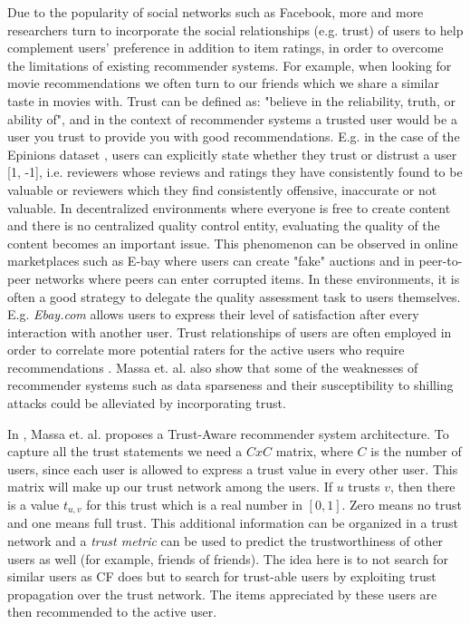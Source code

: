 Due to the popularity of social networks such as Facebook, more and more
researchers turn to incorporate the social relationships (e.g. trust) of users
to help complement users’ preference in addition to item ratings, in order to overcome the limitations of existing recommender systems. For example, when looking for movie recommendations we often turn to our friends which we share a similar taste in movies with. Trust can be defined as: "believe in the reliability, truth, or ability of", and in the context of recommender systems a trusted user would be a user you trust to provide you with good recommendations. E.g. in the case of the Epinions dataset \cite{Epinions}, users can explicitly state whether they trust or distrust a user [1, -1], i.e. reviewers whose reviews and ratings they have consistently found to be valuable or reviewers which they find consistently offensive, inaccurate or not valuable. In decentralized environments where everyone is free to create content and there
is no centralized quality control entity, evaluating the quality of the content becomes an important issue. This phenomenon can be observed in online
marketplaces such as E-bay where users can create "fake" auctions and in peer-to-peer networks where peers can enter corrupted items. In these environments, it is often a good strategy to delegate the quality assessment task to users themselves. E.g. \emph{Ebay.com} allows users to express their level of satisfaction after every interaction with another user. Trust relationships of users are often employed in order to correlate more potential raters for the active users who require recommendations \cite{Massa2004, Massa2007}. Massa et. al. \cite{Massa2004} also show that some of the weaknesses of recommender systems such as data sparseness and their susceptibility to shilling attacks could be alleviated by incorporating trust.

In \cite{Massa2004}, Massa et. al. proposes a Trust-Aware recommender system architecture.
To capture all the trust statements we need a $CxC$ matrix, where $C$ is the number of users, since each user is allowed to express a trust value in every other user. This matrix will make up our trust network among the users. If $u$
trusts $v$, then there is a value $t_{u,v}$ for this trust which is a real
number in $[0,1]$. Zero means no trust and one means full trust. This additional information can be organized in a trust network and a \emph{trust metric} can be used to predict the trustworthiness of other users as well (for example, friends of friends). The idea here is to not search for similar users as CF does but to search for trust-able users by exploiting trust propagation over the trust network. The items appreciated by these users are then recommended to the active user.


